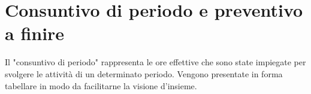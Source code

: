 \section{Consuntivo di periodo e preventivo a finire}
Il "consuntivo di periodo" rappresenta le ore effettive che sono state impiegate per svolgere le attività di un determinato periodo. Vengono presentate in forma tabellare in modo da facilitarne la visione d'insieme. 


\newpage

